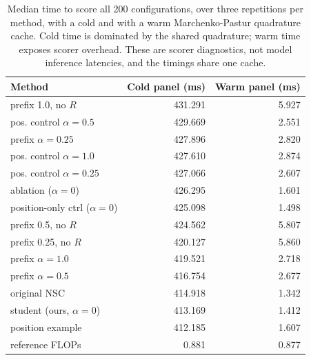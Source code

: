 \begin{table}[t]
\centering
\small
\caption{Median time to score all 200 configurations, over three repetitions per method, with a cold and with a warm Marchenko-Pastur quadrature cache. Cold time is dominated by the shared quadrature; warm time exposes scorer overhead. These are scorer diagnostics, not model inference latencies, and the timings share one cache.}
\label{tab:table9}
\setlength{\tabcolsep}{4pt}
\begin{tabular}{lrr}
\toprule
Method & Cold panel (ms) & Warm panel (ms) \\
\midrule
prefix 1.0, no $R$ & 431.291 & 5.927 \\
pos. control $\alpha = 0.5$ & 429.669 & 2.551 \\
prefix $\alpha = 0.25$ & 427.896 & 2.820 \\
pos. control $\alpha = 1.0$ & 427.610 & 2.874 \\
pos. control $\alpha = 0.25$ & 427.066 & 2.607 \\
ablation ($\alpha = 0$) & 426.295 & 1.601 \\
position-only ctrl ($\alpha = 0$) & 425.098 & 1.498 \\
prefix 0.5, no $R$ & 424.562 & 5.807 \\
prefix 0.25, no $R$ & 420.127 & 5.860 \\
prefix $\alpha = 1.0$ & 419.521 & 2.718 \\
prefix $\alpha = 0.5$ & 416.754 & 2.677 \\
original NSC & 414.918 & 1.342 \\
student (ours, $\alpha = 0$) & 413.169 & 1.412 \\
position example & 412.185 & 1.607 \\
reference FLOPs & 0.881 & 0.877 \\
\bottomrule
\end{tabular}
\end{table}
